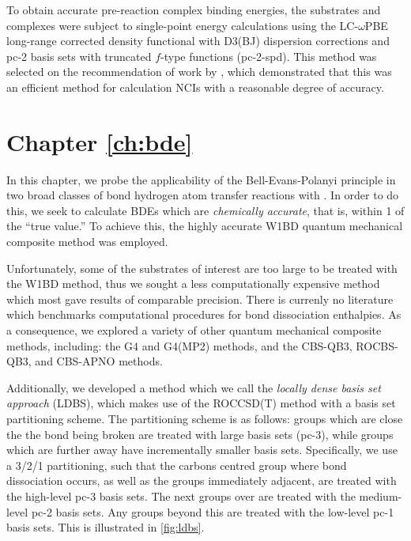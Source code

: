 To obtain accurate pre-reaction complex binding energies, the substrates and
complexes were subject to single-point energy calculations using the
LC-$\omega$PBE long-range corrected density
functional\cite{Vydrov2006,Vydrov2006a} with D3(BJ) dispersion corrections and
pc-2 basis sets with truncated $f$-type functions (pc-2-spd).\cite{Johnson2013}
This method was selected on the recommendation of work by \citet{Johnson2013},
which demonstrated that this was an efficient method for calculation NCIs with a
reasonable degree of accuracy.

\section{Chapter \ref{ch:bde}}

In this chapter, we probe the applicability of the Bell-Evans-Polanyi principle
in two broad classes of  bond hydrogen atom transfer reactions with \cumo. In
order to do this, we seek to calculate BDEs which are \emph{chemically
  accurate}, that is, within 1 \kcalmol of the ``true value.'' To achieve this,
the highly accurate W1BD\cite{Barnes2009} quantum mechanical composite method
was employed.

Unfortunately, some of the substrates of interest are too large to be treated
with the W1BD method, thus we sought a less computationally expensive method
which most gave results of comparable precision. There is currenly no literature
which benchmarks computational procedures for bond dissociation enthalpies. As a
consequence, we explored a variety of other quantum mechanical composite
methods, including: the G4 and G4(MP2) methods,\cite{Curtiss2007,Curtiss2007a}
and the CBS-QB3, ROCBS-QB3, and CBS-APNO
methods.\cite{Montgomery1999,Montgomery2000,Ochterski1996}

  Additionally, we developed a method which we call the \emph{locally
  dense basis set approach} (LDBS), which makes use of the ROCCSD(T) method with
a basis set partitioning scheme. The partitioning scheme is as follows: groups
which are close the the bond being broken are treated with large basis sets
(pc-3), while groups which are further away have incrementally smaller basis
sets. Specifically, we use a 3/2/1 partitioning, such that the carbons centred
group where bond dissociation occurs, as well as the groups immediately
adjacent, are treated with the high-level pc-3 basis sets. The next groups over
are treated with the medium-level pc-2 basis sets. Any groups beyond this are
treated with the low-level pc-1 basis sets. This is illustrated in
\ref{fig:ldbs}.


